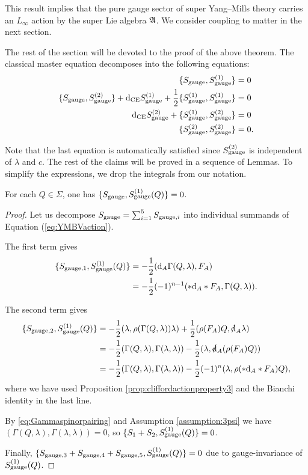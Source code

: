 \documentclass[10pt, oneside]{article}
\begin{document}
This result implies that the pure gauge sector of super Yang--Mills theory carries an $L_\infty$ action by the super Lie algebra $\mathfrak A$.
We consider coupling to matter in the next section.

The rest of the section will be devoted to the proof of the above theorem. The classical master equation decomposes into the following equations:
\begin{align*}
\{S_{\mathrm{gauge}}, S_{\mathrm{gauge}}^{(1)}\} &= 0 \\
\{S_{\mathrm{gauge}}, S_{\mathrm{gauge}}^{(2)}\} + {\rm d}_{\mathrm{CE}} S_{\mathrm{gauge}}^{(1)} + \frac{1}{2}\{S_{\mathrm{gauge}}^{(1)}, S_{\mathrm{gauge}}^{(1)}\} &= 0 \\
{\rm d}_{\mathrm{CE}} S_{\mathrm{gauge}}^{(2)} + \{S_{\mathrm{gauge}}^{(1)}, S_{\mathrm{gauge}}^{(2)}\} &= 0 \\
\{S_{\mathrm{gauge}}^{(2)}, S_{\mathrm{gauge}}^{(2)}\} &= 0.
\end{align*}

Note that the last equation is automatically satisfied since $S_{\mathrm{gauge}}^{(2)}$ is independent of $\lambda$ and $c$. The rest of the claims will be proved in a sequence of Lemmas. To simplify the expressions, we drop the integrals from our notation.

\begin{lemma}
For each $Q\in \Sigma$, one has $\{S_{\mathrm{gauge}}, S_{\mathrm{gauge}}^{(1)}(Q)\} = 0$.
\label{lm:gaugemultiplet1}
\end{lemma}
\begin{proof}
Let us decompose $S_{\mathrm{gauge}} = \sum_{i=1}^5 S_{\mathrm{gauge}, i}$ into individual summands of Equation (\ref{eq:YMBVaction}).

The first term gives
\begin{align*}
\{S_{\mathrm{gauge}, 1}, S_{\mathrm{gauge}}^{(1)}(Q)\} &= -\frac{1}{2} ({\rm d}_A \Gamma(Q, \lambda), F_A)\\
&= -\frac{1}{2}(-1)^{n-1} (\ast {\rm d}_A \ast F_A, \Gamma(Q, \lambda)).
\end{align*}

The second term gives
\begin{align*}
\{S_{\gauge, 2}, S_{\gauge}^{(1)}(Q)\} &= -\frac{1}{2}(\lambda, \rho(\Gamma(Q, \lambda))\lambda) + \frac{1}{2}(\rho(F_A) Q, \sd{\d}_A\lambda) \\
&= -\frac{1}{2}(\Gamma(Q, \lambda), \Gamma(\lambda, \lambda))  - \frac{1}{2}(\lambda, \sd{\d}_A(\rho(F_A) Q)) \\
&= -\frac{1}{2}(\Gamma(Q, \lambda), \Gamma(\lambda, \lambda)) - \frac{1}{2} (-1)^n (\lambda, \rho(\ast \d_A\ast F_A) Q),
\end{align*}
where we have used Proposition \ref{prop:cliffordactionproperty3} and the Bianchi identity in the last line.

By \eqref{eq:Gammaspinorpairing} and Assumption \ref{assumption:3psi} we have $(\Gamma(Q, \lambda), \Gamma(\lambda, \lambda)) = 0$, so $\{S_1 + S_2, S_{\mathrm{gauge}}^{(1)}(Q)\} = 0$.

Finally, $\{S_{\mathrm{gauge},3} + S_{\mathrm{gauge},4} + S_{\mathrm{gauge}, 5}, S_{\mathrm{gauge}}^{(1)}(Q)\} = 0$ due to gauge-invariance of $S_{\mathrm{gauge}}^{(1)}(Q)$.
\end{proof}
\end{document}
